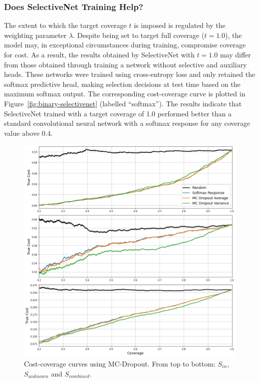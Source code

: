 \subsubsection{Does SelectiveNet Training Help?}
The extent to which the target coverage $t$ is imposed is regulated by the weighting parameter $\lambda$. Despite being set to target full coverage ($t=1.0$), the model may, in exceptional circumstances during training, compromise coverage for cost. As a result, the results obtained by SelectiveNet with $t=1.0$ may differ from those obtained through training a network without selective and auxiliary heads. These networks were trained using cross-entropy loss and only retained the softmax predictive head, making selection decisions at test time based on the maximum softmax output. The corresponding cost-coverage curve is plotted in Figure~\ref{fig:binary-selectivenet} (labelled “softmax”). The results indicate that SelectiveNet trained with a target coverage of 1.0 performed better than a standard convolutional neural network with a softmax response for any coverage value above $0.4$.


\begin{figure}[!h]
	\centering
	\includegraphics[width=\textwidth]{images/binary_mcdropout.png}
	\caption{Cost-coverage curves using MC-Dropout. From top to bottom: $S_{in}$, $S_{unknown}$ and $S_{combined}$.}
	\label{fig:binary-mcdropout}
\end{figure}

